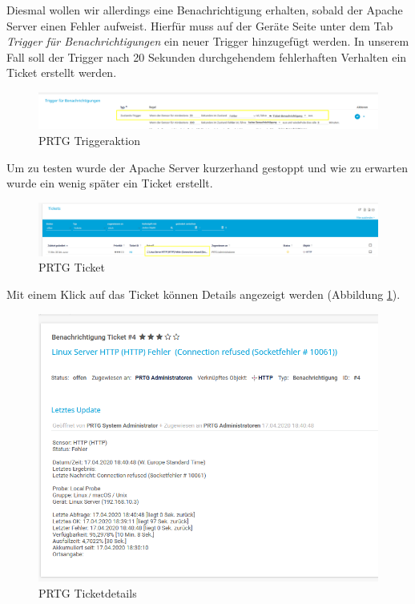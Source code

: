 Diesmal wollen wir allerdings eine Benachrichtigung erhalten, sobald der
Apache Server einen Fehler aufweist. Hierfür muss auf der Geräte Seite
unter dem Tab \emph{Trigger für Benachrichtigungen} ein neuer Trigger
hinzugefügt werden. In unserem Fall soll der Trigger nach 20 Sekunden
durchgehendem fehlerhaften Verhalten ein Ticket erstellt werden.

\begin{figure}[!htb]
\centering
\includegraphics{./images/prtg_ticker.png}
\caption{PRTG Triggeraktion}
\end{figure}

Um zu testen wurde der Apache Server kurzerhand gestoppt und wie zu
erwarten wurde ein wenig später ein Ticket erstellt.

\begin{figure}[!htb]
\centering
\includegraphics{./images/prtg-created-ticket.png}
\caption{PRTG Ticket}
\end{figure}

Mit einem Klick auf das Ticket können Details angezeigt werden
(Abbildung \ref{prtg-ticket}).

\begin{figure}[!htb]
\centering
\includegraphics{./images/prtg-ticket-details.png}
\caption{PRTG Ticketdetails}\label{prtg-ticket}
\end{figure}

